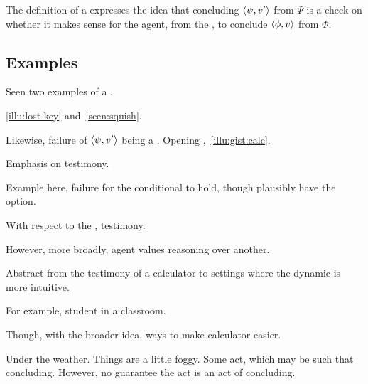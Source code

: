 

\begin{note}
  \color{red}
  The definition of a \curb{} expresses the idea that concluding \(\langle \psi, v' \rangle\) from \(\Psi\) is a check on whether it makes sense for the agent, from the \agpe{}, to conclude \(\langle \phi, v \rangle\) from \(\Phi\).
\end{note}

\subsection{Examples}
\label{cha:zS:sec:curbs:examples}

\begin{note}
  Seen two examples of a \curb{}.

  \autoref{illu:lost-key} and~\autoref{scen:squish}.
\end{note}

\begin{note}[Calculator]
  Likewise, failure of \(\langle \psi, v' \rangle\) being a \curb{}.
  Opening \scen{},~\autoref{illu:gist:calc}.

  Emphasis on testimony.

  Example here, failure for the conditional to hold, though plausibly have the option.

  With respect to the , testimony.

  However, more broadly, agent values reasoning over another.

  Abstract from the testimony of a calculator to settings where the dynamic is more intuitive.

  For example, student in a classroom.

  Though, with the broader idea, ways to make calculator easier.

  Under the weather.
  Things are a little foggy.
  Some act, which may be such that concluding.
  However, no guarantee the act is an act of concluding.
\end{note}

